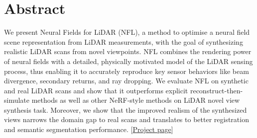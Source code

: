\section*{Abstract}
We present Neural Fields for LiDAR (NFL), a method to optimise a neural field scene representation from LiDAR measurements, with the goal of synthesizing realistic LiDAR scans from novel viewpoints. 
NFL combines the rendering power of neural fields with a detailed, physically motivated model of the LiDAR sensing process, thus enabling it to accurately reproduce key sensor behaviors like beam divergence, secondary returns, and ray dropping.
We evaluate NFL on synthetic and real LiDAR scans and show that it outperforms explicit reconstruct-then-simulate methods as well as other NeRF-style methods on LiDAR novel view synthesis task. Moreover, we show that the improved realism of the synthesized views narrows the domain gap to real scans and translates to better registration and semantic segmentation performance. [\href{https://research.nvidia.com/labs/toronto-ai/nfl/}{Project page}] 